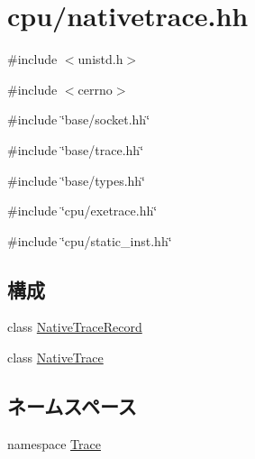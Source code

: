 \hypertarget{cpu_2nativetrace_8hh}{
\section{cpu/nativetrace.hh}
\label{cpu_2nativetrace_8hh}
}
{\ttfamily \#include $<$unistd.h$>$}\par
{\ttfamily \#include $<$cerrno$>$}\par
{\ttfamily \#include \char`\"{}base/socket.hh\char`\"{}}\par
{\ttfamily \#include \char`\"{}base/trace.hh\char`\"{}}\par
{\ttfamily \#include \char`\"{}base/types.hh\char`\"{}}\par
{\ttfamily \#include \char`\"{}cpu/exetrace.hh\char`\"{}}\par
{\ttfamily \#include \char`\"{}cpu/static\_\-inst.hh\char`\"{}}\par
\subsection*{構成}
\begin{DoxyCompactItemize}
\item 
class \hyperlink{classTrace_1_1NativeTraceRecord}{NativeTraceRecord}
\item 
class \hyperlink{classTrace_1_1NativeTrace}{NativeTrace}
\end{DoxyCompactItemize}
\subsection*{ネームスペース}
\begin{DoxyCompactItemize}
\item 
namespace \hyperlink{namespaceTrace}{Trace}
\end{DoxyCompactItemize}
